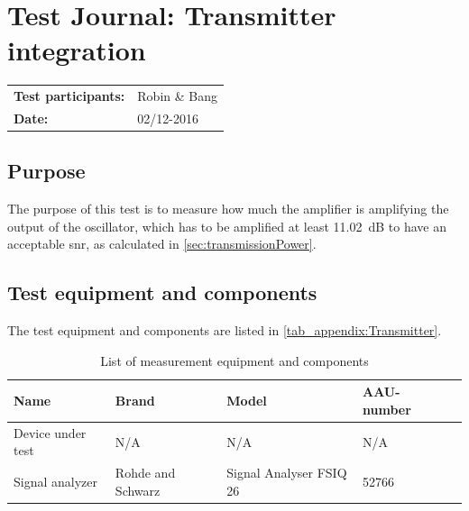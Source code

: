 \chapter{Test Journal: Transmitter integration}\label{appendix:TransmitterInt}
\begin{table}[!h]
\begin{tabular}{l l}
\textbf{Test participants:} & Robin \& Bang\\
\textbf{Date:}  & 02/12-2016
\end{tabular}
\end{table}

\section*{Purpose}
The purpose of this test is to measure how much the amplifier is amplifying the output of the oscillator, which has to be amplified at least \SI{11,02}{\deci\bel} to have an acceptable \gls{snr}, as calculated in \autoref{sec:transmissionPower}. 

\section*{Test equipment and components}
The test equipment and components are listed in \autoref{tab_appendix:Transmitter}.
\begin{table}[!h]
	\centering
	\caption{List of measurement equipment and components}\label{tab_appendix:Transmitter}

	\begin{tabularx}{\textwidth}{lXXXX}
		Name 				& Brand	& Model & AAU-number\\ \toprule \rowcolor{lightGrey}
		Device under test & N/A & N/A & N/A \\
		Signal analyzer & Rohde and Schwarz & Signal Analyser FSIQ 26 & 52766\\
	\end{tabularx}
\end{table}

